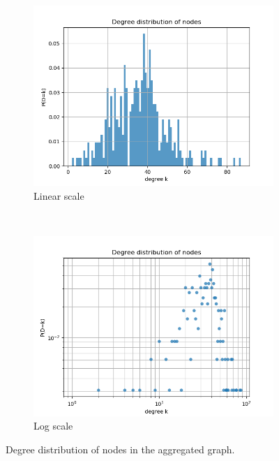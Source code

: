 \documentclass[letterpaper]{article}
\begin{document}
\begin{figure}
    \centering
    \begin{subfigure}[b]{0.45\textwidth}
        \includegraphics[width=\textwidth]{img/degree_distribution.png}
        \caption{Linear scale}
	    \label{fig:degree_distribution_linlin}
    \end{subfigure}
    ~ %
    \begin{subfigure}[b]{0.45\textwidth}
        \includegraphics[width=\textwidth]{img/degree_distribution_loglog.png}
        \caption{Log scale}
	    \label{fig:degree_distribution_loglog}
    \end{subfigure}
    \caption{Degree distribution of nodes in the aggregated graph.}
    \label{fig:degree_distribution}
\end{figure}
\end{document}
